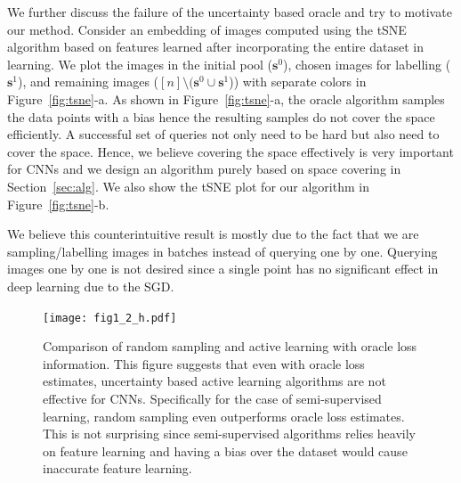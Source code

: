\documentclass{article}
\begin{document}
We further discuss the failure of the uncertainty based oracle and try to motivate our method. Consider an embedding of images computed using the tSNE\cite{tsne} algorithm based on features learned after incorporating the entire dataset in learning. We plot the images in the initial pool ($\mathbf{s}^0$), chosen images for labelling ($\mathbf{s}^1$), and remaining images ($[n] \setminus (\mathbf{s}^0 \cup \mathbf{s}^1$)) with separate colors in Figure~\ref{fig:tsne}-a. As shown in Figure~\ref{fig:tsne}-a, the oracle algorithm samples the data points with a bias hence the resulting samples do not cover the space efficiently. A successful set of queries not only need to be hard but also need to cover the space. Hence, we believe covering the space effectively is very important for CNNs and we design an algorithm purely based on space covering in Section~\ref{sec:alg}. We also show the tSNE plot for our algorithm in Figure~\ref{fig:tsne}-b.

We believe this counterintuitive result is mostly due to the fact that we are sampling/labelling images in batches instead of querying one by one. Querying images one by one is not desired since a single point has no significant effect in deep learning due to the SGD. 

\begin{figure}[t]
\vspace{-3mm}
\texttt{[image: fig1\_2\_h.pdf]}
\vspace{-5mm}
\caption{Comparison of random sampling and active learning with oracle loss information. This figure suggests that even with oracle loss estimates, uncertainty based active learning algorithms are not effective for CNNs. Specifically for the case of semi-supervised learning, random sampling even outperforms oracle loss estimates. This is not surprising since semi-supervised algorithms relies heavily on feature learning and having a bias over the dataset would cause inaccurate feature learning.}
\label{fig:neg}
\end{figure}
\end{document}
